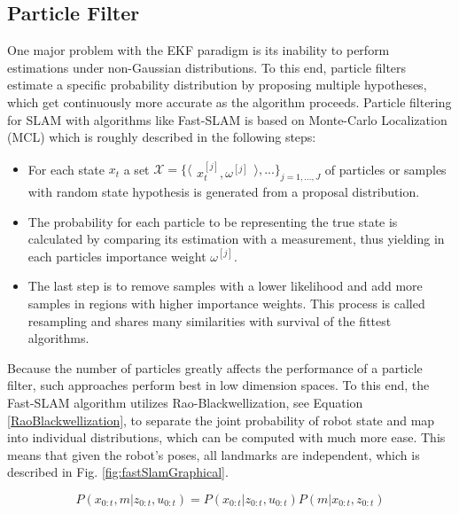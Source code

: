 
\subsection{Particle Filter}
One major problem with the EKF paradigm is its inability to perform estimations under non-Gaussian distributions. 
To this end, particle filters estimate a specific probability distribution by proposing multiple hypotheses, which get continuously more accurate as the algorithm proceeds. 
Particle filtering for SLAM with algorithms like Fast-SLAM is based on Monte-Carlo Localization (MCL) which is roughly described in the following steps:
\begin{itemize}
	\item For each state $ x_{t} $ a set 
	$
	\mathcal{X} = 
	\{ 
	\langle
	\begin{matrix}
		 x_{t}^{[j]},  \omega^{[j]}
	\end{matrix}
	\rangle
	, ...
	\}
	_{j=1, ..., J}
	$
	of particles or samples 
	with random state hypothesis is generated from a proposal distribution. %
	\item The probability for each particle to be representing the true state is calculated by comparing its estimation with a measurement, thus yielding in each particles importance weight $ \omega^{[j]} $.
	\item The last step is to remove samples with a lower likelihood and add more samples in regions with higher importance weights. This process is called resampling and shares many similarities with survival of the fittest algorithms.
\end{itemize}

Because the number of particles greatly affects the performance of a particle filter, such approaches perform best in low dimension spaces. To this end, the Fast-SLAM algorithm utilizes Rao-Blackwellization, see Equation \ref{RaoBlackwellization}, to separate the joint probability of robot state and map into individual distributions, which can be computed with much more ease.
This means that given the robot's poses, all landmarks are independent, which is described in Fig. \ref{fig:fastSlamGraphical}.

\begin{equation}\label{RaoBlackwellization}
	P(x_{0:t}, m | z_{0:t}, u_{0:t}) = P(x_{0:t} | z_{0:t}, u_{0:t}) P(m | x_{0:t}, z_{0:t})
\end{equation}

